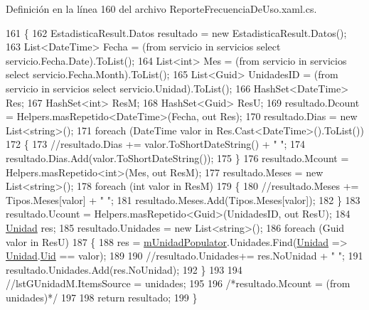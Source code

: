 Definición en la línea 160 del archivo Reporte\-Frecuencia\-De\-Uso.\-xaml.\-cs.


\begin{DoxyCode}
161         \{
162             EstadisticaResult.Datos resultado = \textcolor{keyword}{new} EstadisticaResult.Datos();
163             List<DateTime> Fecha = (from servicio in servicios select servicio.Fecha.Date).ToList();
164             List<int> Mes = (from servicio in servicios select servicio.Fecha.Month).ToList();
165             List<Guid> UnidadesID = (from servicio in servicios select servicio.Unidad).ToList();
166             HashSet<DateTime> Res;
167             HashSet<int> ResM;
168             HashSet<Guid> ResU;
169             resultado.Dcount = Helpers.masRepetido<DateTime>(Fecha, out Res);
170             resultado.Dias = \textcolor{keyword}{new} List<string>();
171             \textcolor{keywordflow}{foreach} (DateTime valor \textcolor{keywordflow}{in} Res.Cast<DateTime>().ToList())
172             \{
173                 \textcolor{comment}{//resultado.Dias += valor.ToShortDateString() + " ";}
174                 resultado.Dias.Add(valor.ToShortDateString());
175             \}
176             resultado.Mcount = Helpers.masRepetido<\textcolor{keywordtype}{int}>(Mes, out ResM);
177             resultado.Meses = \textcolor{keyword}{new} List<string>();
178             \textcolor{keywordflow}{foreach} (\textcolor{keywordtype}{int} valor \textcolor{keywordflow}{in} ResM)
179             \{
180                 \textcolor{comment}{//resultado.Meses += Tipos.Meses[valor] + " ";}
181                 resultado.Meses.Add(Tipos.Meses[valor]);
182             \}
183             resultado.Ucount = Helpers.masRepetido<Guid>(UnidadesID, out ResU);
184             \hyperlink{class_proyecto___integrador__3_1_1_tipos_dato_1_1_unidad}{Unidad} res;
185             resultado.Unidades = \textcolor{keyword}{new} List<string>();
186             \textcolor{keywordflow}{foreach} (Guid valor \textcolor{keywordflow}{in} ResU)
187             \{
188                 res = \hyperlink{class_proyecto___integrador__3_1_1_reportes_1_1_reporte_frecuencia_de_uso_a91106ba7bf23e61d729bc0399ef5fa98}{mUnidadPopulator}.Unidades.Find(\hyperlink{class_proyecto___integrador__3_1_1_tipos_dato_1_1_unidad}{Unidad} => 
      \hyperlink{class_proyecto___integrador__3_1_1_tipos_dato_1_1_unidad}{Unidad}.\hyperlink{class_proyecto___integrador__3_1_1_tipos_dato_1_1_unidad_aa2e602251694986f3d519ee3db5ffa38}{Uid} == valor);
189 
190                 \textcolor{comment}{//resultado.Unidades+= res.NoUnidad + " ";}
191                 resultado.Unidades.Add(res.NoUnidad);
192             \}
193 
194             \textcolor{comment}{//lstGUnidadM.ItemsSource = unidades;}
195 
196             \textcolor{comment}{/*resultado.Mcount = (from unidades)*/}
197 
198             \textcolor{keywordflow}{return} resultado;
199         \}
\end{DoxyCode}
